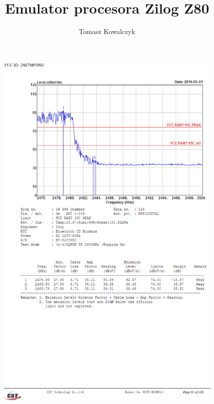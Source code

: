 \documentclass[12pt,a4paper]{report}
\begin{document}
	
	
	\author{Tomasz Kowalczyk}
	\title{Emulator procesora Zilog Z80}
	\maketitle
	
	\leavevmode\thispagestyle{empty}\newpage
	
	\pagestyle{empty}
	\begin{figure}[H]
		\vspace{-2.5cm}
		\hspace{-3.5cm}
		\includegraphics[width=.9\paperwidth]{testa4.png}
	\end{figure}
	
\end{document}
